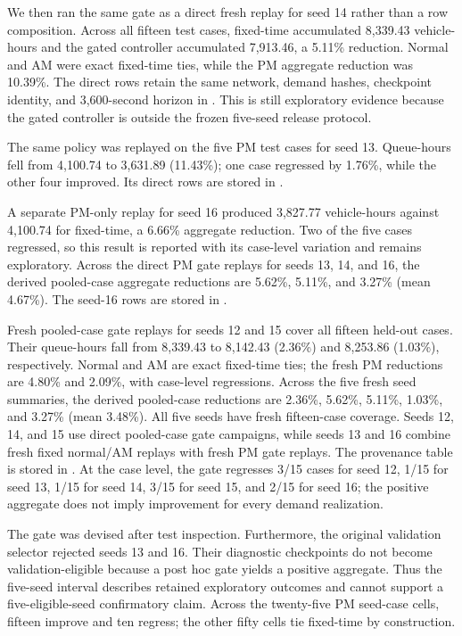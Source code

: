 \documentclass[12pt,a4paper]{report}
\begin{document}
We then ran the same gate as a direct fresh replay for seed 14 rather than a
row composition. Across all fifteen test cases, fixed-time accumulated 8,339.43
vehicle-hours and the gated controller accumulated 7,913.46, a 5.11\%
reduction. Normal and AM were exact fixed-time ties, while the PM aggregate
reduction was 10.39\%. The direct rows retain the same network, demand hashes,
checkpoint identity, and 3,600-second horizon in
.
This is still exploratory evidence because the gated controller is outside the
frozen five-seed release protocol.

The same policy was replayed on the five PM test cases for seed 13. Queue-hours
fell from 4,100.74 to 3,631.89 (11.43\%); one case regressed by 1.76\%, while
the other four improved. Its direct rows are stored in
.

A separate PM-only replay for seed 16 produced 3,827.77 vehicle-hours
against 4,100.74 for fixed-time, a 6.66\% aggregate reduction. Two of the five
cases regressed, so this result is reported with its case-level variation and
remains exploratory. Across the direct PM gate replays for seeds 13, 14, and
16, the derived pooled-case aggregate reductions are 5.62\%, 5.11\%, and 3.27\%
(mean 4.67\%). The seed-16 rows are stored in
.

Fresh pooled-case gate replays for seeds 12 and 15 cover all fifteen held-out
cases. Their queue-hours fall from 8,339.43 to 8,142.43 (2.36\%) and 8,253.86
(1.03\%), respectively. Normal and AM are exact fixed-time ties; the fresh PM
reductions are 4.80\% and 2.09\%, with case-level regressions. Across the five fresh
seed summaries, the derived pooled-case reductions are 2.36\%, 5.62\%, 5.11\%,
1.03\%, and 3.27\% (mean 3.48\%). All five seeds have fresh fifteen-case
coverage. Seeds 12, 14, and 15 use direct pooled-case gate
campaigns, while seeds 13 and 16 combine fresh fixed normal/AM replays with
fresh PM gate replays. The provenance table is stored in
.
At the case level, the gate regresses 3/15 cases for seed 12, 1/15 for seed 13,
1/15 for seed 14, 3/15 for seed 15, and 2/15 for seed 16; the positive aggregate
does not imply improvement for every demand realization.

The gate was devised after test inspection. Furthermore, the original validation selector rejected seeds 13 and 16. Their diagnostic checkpoints do not become validation-eligible because a post hoc gate yields a positive aggregate. Thus the five-seed interval describes retained exploratory outcomes and cannot support a five-eligible-seed confirmatory claim. Across the twenty-five PM seed-case cells, fifteen improve and ten regress; the other fifty cells tie fixed-time by construction.
\end{document}
